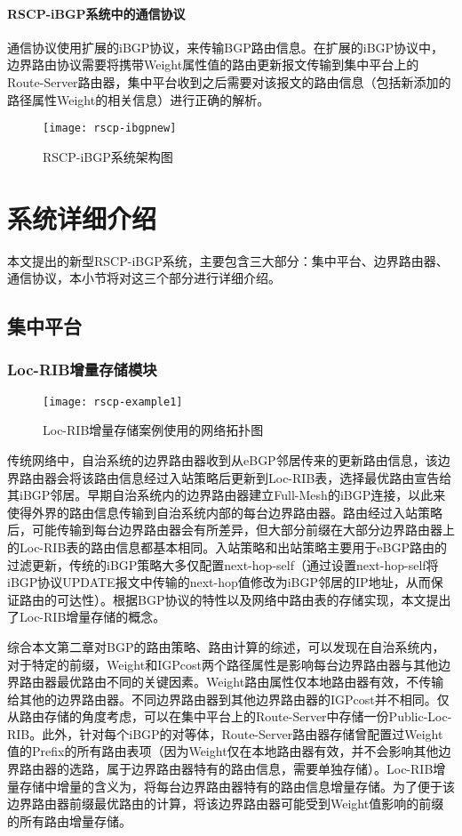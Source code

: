 \paragraph{RSCP-iBGP系统中的通信协议} 通信协议使用扩展的iBGP协议，来传输BGP路由信息。在扩展的iBGP协议中，边界路由协议需要将携带Weight属性值的路由更新报文传输到集中平台上的Route-Server路由器，集中平台收到之后需要对该报文的路由信息（包括新添加的路径属性Weight的相关信息）进行正确的解析。

\begin{figure}
  \centering
  \texttt{[image: rscp-ibgpnew]}
  \caption{RSCP-iBGP系统架构图}
  \label{fig:rscp-ibgpnew}
\end{figure}

\section{系统详细介绍}
本文提出的新型RSCP-iBGP系统，主要包含三大部分：集中平台、边界路由器、通信协议，本小节将对这三个部分进行详细介绍。
\subsection{集中平台}
\subsubsection{Loc-RIB增量存储模块}

\begin{figure}
  \centering
  \texttt{[image: rscp-example1]}
  \caption{Loc-RIB增量存储案例使用的网络拓扑图}
  \label{fig:rscp-example1}
\end{figure}

传统网络中，自治系统的边界路由器收到从eBGP邻居传来的更新路由信息，该边界路由器会将该路由信息经过入站策略后更新到Loc-RIB表，选择最优路由宣告给其iBGP邻居。早期自治系统内的边界路由器建立Full-Mesh的iBGP连接，以此来使得外界的路由信息传输到自治系统内部的每台边界路由器。路由经过入站策略后，可能传输到每台边界路由器会有所差异，但大部分前缀在大部分边界路由器上的Loc-RIB表的路由信息都基本相同。入站策略和出站策略主要用于eBGP路由的过滤更新，传统的iBGP策略大多仅配置next-hop-self（通过设置next-hop-self将iBGP协议UPDATE报文中传输的next-hop值修改为iBGP邻居的IP地址，从而保证路由的可达性）。根据BGP协议的特性以及网络中路由表的存储实现，本文提出了Loc-RIB增量存储的概念。

综合本文第二章对BGP的路由策略、路由计算的综述，可以发现在自治系统内，对于特定的前缀，Weight和IGPcost两个路径属性是影响每台边界路由器与其他边界路由器最优路由不同的关键因素。Weight路由属性仅本地路由器有效，不传输给其他的边界路由器。不同边界路由器到其他边界路由器的IGPcost并不相同。仅从路由存储的角度考虑，可以在集中平台上的Route-Server中存储一份Public-Loc-RIB。此外，针对每个iBGP的对等体，Route-Server路由器存储曾配置过Weight值的Prefix的所有路由表项（因为Weight仅在本地路由器有效，并不会影响其他边界路由器的选路，属于边界路由器特有的路由信息，需要单独存储）。Loc-RIB增量存储中增量的含义为，将每台边界路由器特有的路由信息增量存储。为了便于该边界路由器前缀最优路由的计算，将该边界路由器可能受到Weight值影响的前缀的所有路由增量存储。



